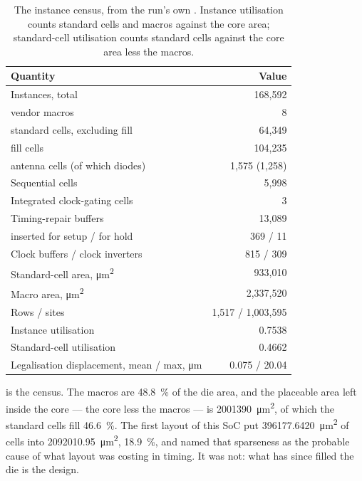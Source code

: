 \begin{table}[tbp]
\centering
\caption{The instance census, from the run's own
. Instance utilisation counts standard cells
and macros against the core area; standard-cell utilisation counts
standard cells against the core area less the macros.}
\label{tab:phys-census}
\small
\begin{tabular}{@{}lr@{}}
\toprule
\textbf{Quantity} & \textbf{Value} \\
\midrule
Instances, total & 168{,}592 \\
\quad vendor macros & 8 \\
\quad standard cells, excluding fill & 64{,}349 \\
\quad fill cells & 104{,}235 \\
\quad antenna cells (of which diodes) & 1{,}575 (1{,}258) \\
Sequential cells & 5{,}998 \\
Integrated clock-gating cells & 3 \\
Timing-repair buffers & 13{,}089 \\
\quad inserted for setup / for hold & 369 / 11 \\
Clock buffers / clock inverters & 815 / 309 \\
Standard-cell area, \si{\micro\metre\squared} & 933{,}010 \\
Macro area, \si{\micro\metre\squared} & 2{,}337{,}520 \\
Rows / sites & 1{,}517 / 1{,}003{,}595 \\
Instance utilisation & 0.7538 \\
Standard-cell utilisation & 0.4662 \\
Legalisation displacement, mean / max, \si{\micro\metre} & 0.075 / 20.04 \\
\bottomrule
\end{tabular}
\end{table}

 is the census. The macros are
\qty{48.8}{\percent} of the die area, and the placeable area left inside
the core --- the core less the macros --- is
\qty{2001390}{\micro\metre\squared}, of which the standard cells fill
\qty{46.6}{\percent}. The first layout of this SoC put
\qty{396177.6420}{\micro\metre\squared} of cells into
\qty{2092010.95}{\micro\metre\squared}, \qty{18.9}{\percent}, and
 named that sparseness as the probable cause of
what layout was costing in timing. It was not: what has since filled the
die is the design.

